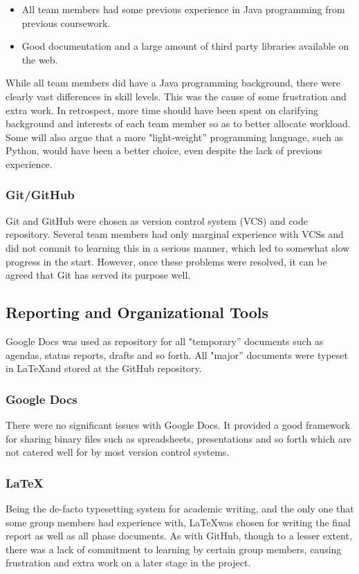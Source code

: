 \begin{itemize}
\item All team members had some previous experience in Java
  programming from previous coursework.
\item Good documentation and a large amount of third party libraries
  available on the web.
\end{itemize}

While all team members did have a Java programming background, there
were clearly vast differences in skill levels. This was the cause of
some frustration and extra work. In retrospect, more time should have been spent
on clarifying background and interests of each team member so as to
better allocate workload. Some will also argue that a more
"light-weight'' programming language, such as Python, would have been a
better choice, even despite the lack of previous experience.

\subsubsection{Git/GitHub}
Git and GitHub were chosen as version control system (VCS) and code
repository. Several team members had only marginal experience with
VCSs and did not commit to learning this in a serious manner, which
led to somewhat slow progress in the start. However, once these problems
were resolved, it can be agreed that Git has served its purpose well.


\subsection{Reporting and Organizational Tools}
Google Docs was used as repository for all "temporary'' documents such
as agendas, status reports, drafts and so forth. All "major''
documents were typeset in \LaTeX and stored at the GitHub repository.

\subsubsection{Google Docs}
There were no significant issues with Google Docs. It provided a good
framework for sharing binary files such as spreadsheets, presentations and so forth which
are not catered well for by most version control systems.


\subsubsection{\LaTeX}
Being the de-facto typesetting system for academic writing, and the
only one that some group members had experience with, \LaTeX was
chosen for writing the final report as well as all phase documents. As
with GitHub, though to a lesser extent,  there was a lack of commitment to learning by certain
group members, causing frustration and extra work on a later stage
in the project.


